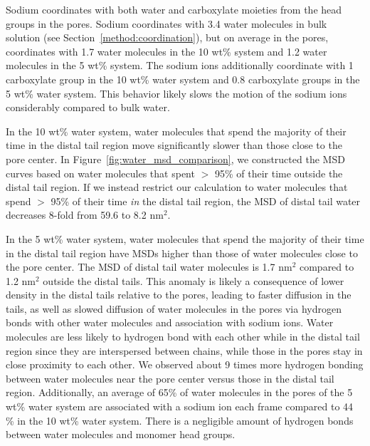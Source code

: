\documentclass[journal=jpcbfk,manuscript=article]{achemso}
\begin{document}
  Sodium coordinates with both water and carboxylate moieties from the head groups in the pores.
  Sodium coordinates with 3.4 water molecules in bulk solution (see 
  Section~\ref{method:coordination}), but on average in the pores,
  coordinates with 1.7 water molecules in the 10 wt\% system and 1.2 water
  molecules in the 5 wt\% system. The sodium ions additionally coordinate with 1 carboxylate group in the 10 wt\% water
  system and 0.8 carboxylate groups in the 5 wt\% water system. This behavior likely
  slows the motion of the sodium ions considerably compared to bulk water.

  In the 10 wt\% water system, water molecules that spend the majority of 
  their time in the distal tail region move significantly slower than those
  close to the pore center. In Figure~\ref{fig:water_msd_comparison}, we 
  constructed the MSD curves based on water molecules that spent $>$ 95\% of their
  time outside the distal tail region. If we instead restrict our calculation to
  water molecules that spend $>$ 95\% of their time \textit{in} the distal tail region, 
  the MSD of distal tail water decreases 8-fold from 59.6 to 8.2 nm$^2$. 
  
  In the 5 wt\% water system, water molecules that spend the majority of their 
  time in the distal tail region have MSDs higher than those of water molecules
  close to the pore center. The MSD of distal tail water molecules is 1.7 nm$^2$
  compared to 1.2 nm$^2$ outside the distal tails. This anomaly is likely a 
  consequence of lower density in the distal tails relative to the pores,
  leading to faster diffusion in the tails,
  as well as slowed diffusion of water molecules in the pores via hydrogen bonds
  with other water molecules and association with sodium ions. Water molecules 
  are less likely to hydrogen bond with each other while in the distal tail 
  region since they are interspersed between chains, while those in 
  the pores stay in close proximity to each other. We observed about 9 times more  %
  hydrogen bonding between water molecules near the pore center versus those in 
  the distal tail region. Additionally, an average of 65\% of water molecules in
  the pores of the 5 wt\% water system are associated with a sodium ion each frame
  compared to 44 \% in the 10 wt\% water system. There is a negligible amount of
  hydrogen bonds between water molecules and monomer head groups. 
  
\end{document}
